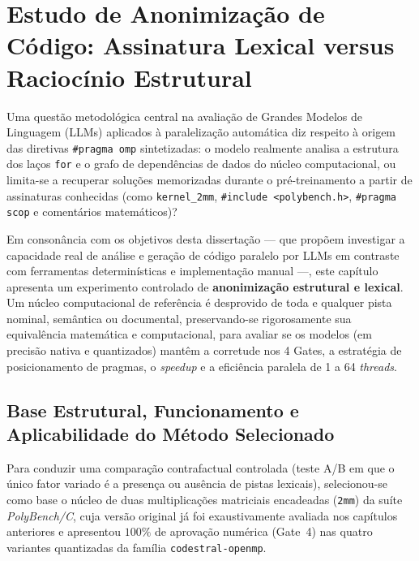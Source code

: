 
\chapter{Estudo de Anonimização de Código: Assinatura Lexical versus Raciocínio Estrutural}
\label{cap:anonimizacao}

Uma questão metodológica central na avaliação de Grandes Modelos de Linguagem (LLMs) aplicados à paralelização automática diz respeito à origem das diretivas \texttt{\#pragma omp} sintetizadas: o modelo realmente analisa a estrutura dos laços \texttt{for} e o grafo de dependências de dados do núcleo computacional, ou limita-se a recuperar soluções memorizadas durante o pré-treinamento a partir de assinaturas conhecidas (como \texttt{kernel\_2mm}, \texttt{\#include <polybench.h>}, \texttt{\#pragma scop} e comentários matemáticos)?

Em consonância com os objetivos desta dissertação --- que propõem investigar a capacidade real de análise e geração de código paralelo por LLMs em contraste com ferramentas determinísticas e implementação manual ---, este capítulo apresenta um experimento controlado de \textbf{anonimização estrutural e lexical}. Um núcleo computacional de referência é desprovido de toda e qualquer pista nominal, semântica ou documental, preservando-se rigorosamente sua equivalência matemática e computacional, para avaliar se os modelos (em precisão nativa e quantizados) mantêm a corretude nos 4 Gates, a estratégia de posicionamento de pragmas, o \textit{speedup} e a eficiência paralela de 1 a 64 \textit{threads}.

\section{Base Estrutural, Funcionamento e Aplicabilidade do Método Selecionado}
\label{sec:anon_base}

Para conduzir uma comparação contrafactual controlada (teste A/B em que o único fator variado é a presença ou ausência de pistas lexicais), selecionou-se como base o núcleo de duas multiplicações matriciais encadeadas (\texttt{2mm}) da suíte \textit{PolyBench/C}, cuja versão original já foi exaustivamente avaliada nos capítulos anteriores e apresentou $100\%$ de aprovação numérica (Gate~4) nas quatro variantes quantizadas da família \texttt{codestral-openmp}.

